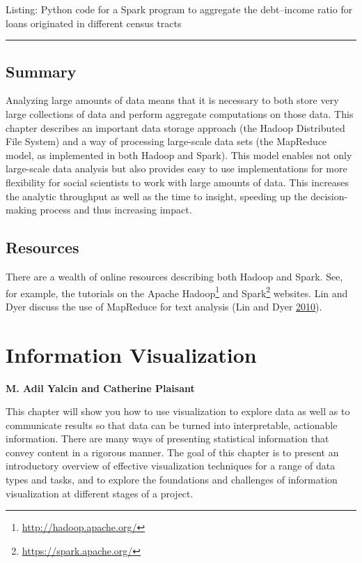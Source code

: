 \documentclass[]{krantz}
\begin{document}
Listing: Python code for a Spark program to aggregate the debt--income
ratio for loans originated in different census tracts

\begin{center}\rule{0.5\linewidth}{\linethickness}\end{center}

\section{Summary}\label{summary-3}

Analyzing large amounts of data means that it is necessary to both store
very large collections of data and perform aggregate computations on
those data. This chapter describes an important data storage approach
(the Hadoop Distributed File System) and a way of processing large-scale
data sets (the MapReduce model, as implemented in both Hadoop and
Spark). This model enables not only large-scale data analysis but also
provides easy to use implementations for more flexibility for social
scientists to work with large amounts of data. This increases the
analytic throughput as well as the time to insight, speeding up the
decision-making process and thus increasing impact.

\section{Resources}\label{resources-2}

There are a wealth of online resources describing both Hadoop and Spark.
See, for example, the tutorials on the Apache Hadoop\footnote{\url{http://hadoop.apache.org/}}
and Spark\footnote{\url{https://spark.apache.org/}} websites. Lin and
Dyer discuss the use of MapReduce for text analysis (Lin and Dyer
\protect\hyperlink{ref-lin2010data}{2010}).

\hypertarget{chap:viz}{\chapter{Information
Visualization}\label{chap:viz}}

\textbf{M. Adil Yalcin and Catherine Plaisant}

This chapter will show you how to use visualization to explore data as
well as to communicate results so that data can be turned into
interpretable, actionable information. There are many ways of presenting
statistical information that convey content in a rigorous manner. The
goal of this chapter is to present an introductory overview of effective
visualization techniques for a range of data types and tasks, and to
explore the foundations and challenges of information visualization at
different stages of a project.
\end{document}

